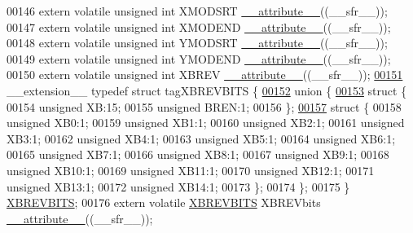 \begin{DoxyCode}
00146 \textcolor{keyword}{extern} \textcolor{keyword}{volatile} \textcolor{keywordtype}{unsigned} \textcolor{keywordtype}{int}  XMODSRT \hyperlink{a00009_a493c46f03454991ccc5aa7a6e1dfb2a7}{\_\_attribute\_\_}((\_\_sfr\_\_));
00147 \textcolor{keyword}{extern} \textcolor{keyword}{volatile} \textcolor{keywordtype}{unsigned} \textcolor{keywordtype}{int}  XMODEND \hyperlink{a00009_a493c46f03454991ccc5aa7a6e1dfb2a7}{\_\_attribute\_\_}((\_\_sfr\_\_));
00148 \textcolor{keyword}{extern} \textcolor{keyword}{volatile} \textcolor{keywordtype}{unsigned} \textcolor{keywordtype}{int}  YMODSRT \hyperlink{a00009_a493c46f03454991ccc5aa7a6e1dfb2a7}{\_\_attribute\_\_}((\_\_sfr\_\_));
00149 \textcolor{keyword}{extern} \textcolor{keyword}{volatile} \textcolor{keywordtype}{unsigned} \textcolor{keywordtype}{int}  YMODEND \hyperlink{a00009_a493c46f03454991ccc5aa7a6e1dfb2a7}{\_\_attribute\_\_}((\_\_sfr\_\_));
00150 \textcolor{keyword}{extern} \textcolor{keyword}{volatile} \textcolor{keywordtype}{unsigned} \textcolor{keywordtype}{int}  XBREV \hyperlink{a00009_a493c46f03454991ccc5aa7a6e1dfb2a7}{\_\_attribute\_\_}((\_\_sfr\_\_));
\hypertarget{a00009_source_l00151}{}\hyperlink{a00008}{00151} \_\_extension\_\_ \textcolor{keyword}{typedef} \textcolor{keyword}{struct }tagXBREVBITS \{
\hypertarget{a00009_source_l00152}{}\hyperlink{a00009}{00152}   \textcolor{keyword}{union }\{
\hypertarget{a00009_source_l00153}{}\hyperlink{a00009}{00153}     \textcolor{keyword}{struct }\{
00154       \textcolor{keywordtype}{unsigned} XB:15;
00155       \textcolor{keywordtype}{unsigned} BREN:1;
00156     \};
\hypertarget{a00009_source_l00157}{}\hyperlink{a00009}{00157}     \textcolor{keyword}{struct }\{
00158       \textcolor{keywordtype}{unsigned} XB0:1;
00159       \textcolor{keywordtype}{unsigned} XB1:1;
00160       \textcolor{keywordtype}{unsigned} XB2:1;
00161       \textcolor{keywordtype}{unsigned} XB3:1;
00162       \textcolor{keywordtype}{unsigned} XB4:1;
00163       \textcolor{keywordtype}{unsigned} XB5:1;
00164       \textcolor{keywordtype}{unsigned} XB6:1;
00165       \textcolor{keywordtype}{unsigned} XB7:1;
00166       \textcolor{keywordtype}{unsigned} XB8:1;
00167       \textcolor{keywordtype}{unsigned} XB9:1;
00168       \textcolor{keywordtype}{unsigned} XB10:1;
00169       \textcolor{keywordtype}{unsigned} XB11:1;
00170       \textcolor{keywordtype}{unsigned} XB12:1;
00171       \textcolor{keywordtype}{unsigned} XB13:1;
00172       \textcolor{keywordtype}{unsigned} XB14:1;
00173     \};
00174   \};
00175 \} \hyperlink{a00008_dd/db2/a00866}{XBREVBITS};
00176 \textcolor{keyword}{extern} \textcolor{keyword}{volatile} \hyperlink{a00008_dd/db2/a00866}{XBREVBITS} XBREVbits \hyperlink{a00009_a493c46f03454991ccc5aa7a6e1dfb2a7}{\_\_attribute\_\_}((\_\_sfr\_\_));

\end{DoxyCode}
